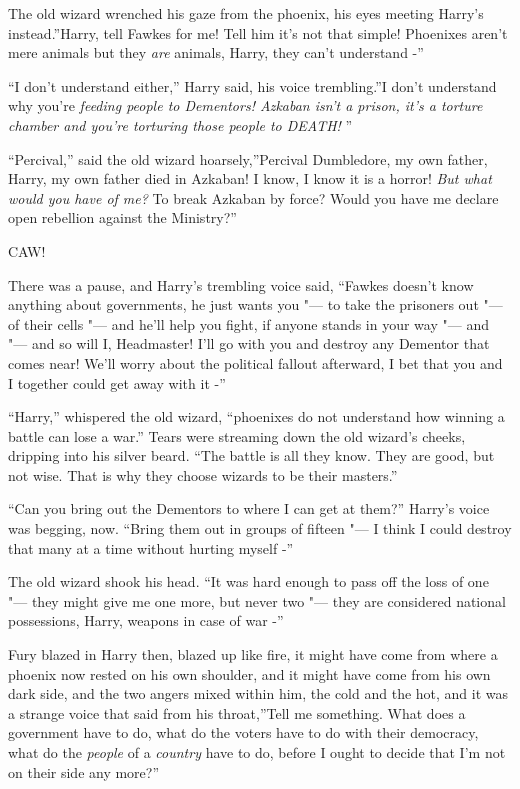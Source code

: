 The old wizard wrenched his gaze from the phoenix, his eyes meeting
Harry's instead.''Harry, tell Fawkes for me! Tell him it's not that
simple! Phoenixes aren't mere animals but they \emph{are} animals,
Harry, they can't understand -''

``I don't understand either,'' Harry said, his voice trembling.''I don't
understand why you're \emph{feeding people to Dementors! Azkaban isn't a
prison, it's a torture chamber and you're torturing those people to
DEATH!} ''

``Percival,'' said the old wizard hoarsely,''Percival Dumbledore, my own
father, Harry, my own father died in Azkaban! I know, I know it is a
horror! \emph{But what would you have of me?} To break Azkaban by force?
Would you have me declare open rebellion against the Ministry?''

CAW!

There was a pause, and Harry's trembling voice said, ``Fawkes doesn't
know anything about governments, he just wants you "--- to take the
prisoners out "--- of their cells "--- and he'll help you fight, if anyone
stands in your way "--- and "--- and so will I, Headmaster! I'll go with you
and destroy any Dementor that comes near! We'll worry about the
political fallout afterward, I bet that you and I together could get
away with it -''

``Harry,'' whispered the old wizard, ``phoenixes do not understand how
winning a battle can lose a war.'' Tears were streaming down the old
wizard's cheeks, dripping into his silver beard. ``The battle is all
they know. They are good, but not wise. That is why they choose wizards
to be their masters.''

``Can you bring out the Dementors to where I can get at them?'' Harry's
voice was begging, now. ``Bring them out in groups of fifteen "--- I think
I could destroy that many at a time without hurting myself -''

The old wizard shook his head. ``It was hard enough to pass off the loss
of one "--- they might give me one more, but never two "--- they are
considered national possessions, Harry, weapons in case of war -''

Fury blazed in Harry then, blazed up like fire, it might have come from
where a phoenix now rested on his own shoulder, and it might have come
from his own dark side, and the two angers mixed within him, the cold
and the hot, and it was a strange voice that said from his throat,''Tell
me something. What does a government have to do, what do the voters have
to do with their democracy, what do the \emph{people} of a
\emph{country} have to do, before I ought to decide that I'm not on
their side any more?''

